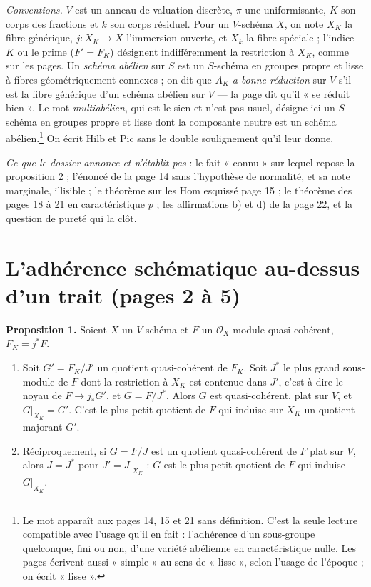 \documentclass[11pt,a4paper]{article}
\begin{document}
\emph{Conventions.} $V$ est un anneau de valuation discrète, $\pi$ une
uniformisante, $K$ son corps des fractions et $k$ son corps résiduel. Pour un
$V$-schéma $X$, on note $X_K$ la fibre générique, $j \colon X_K \to X$
l'immersion ouverte, et $X_k$ la fibre spéciale ; l'indice $K$ ou le prime
($F' = F_K$) désignent indifféremment la restriction à $X_K$, comme sur les
pages. Un \emph{schéma abélien} sur $S$ est un $S$-schéma en groupes propre et
lisse à fibres géométriquement connexes ; on dit que $A_K$ \emph{a bonne
réduction} sur $V$ s'il est la fibre générique d'un schéma abélien sur $V$ ---
la page dit qu'il « se réduit bien ». Le mot \emph{multiabélien}, qui est le
sien et n'est pas usuel, désigne ici un $S$-schéma en groupes propre et lisse
dont la composante neutre est un schéma abélien.\footnote{Le mot apparaît aux
pages 14, 15 et 21 sans définition. C'est la seule lecture compatible avec
l'usage qu'il en fait : l'adhérence d'un sous-groupe quelconque, fini ou non,
d'une variété abélienne en caractéristique nulle. Les pages écrivent aussi
« simple » au sens de « lisse », selon l'usage de l'époque ; on écrit
« lisse ».} On écrit $\mathrm{Hilb}$ et $\mathrm{Pic}$ sans le double
soulignement qu'il leur donne.

\emph{Ce que le dossier annonce et n'établit pas} : le fait « connu » sur
lequel repose la proposition 2 ; l'énoncé de la page 14 sans l'hypothèse de
normalité, et sa note marginale, illisible ; le théorème sur les
$\mathrm{Hom}$ esquissé page 15 ; le théorème des pages 18 à 21 en
caractéristique $p$ ; les affirmations b) et d) de la page 22, et la question
de pureté qui la clôt.

\section*{L'adhérence schématique au-dessus d'un trait (pages 2 à 5)}

\textbf{Proposition 1.} Soient $X$ un $V$-schéma et $F$ un $\mathcal{O}_X$-module
quasi-cohérent, $F_K = j^{*}F$.
\begin{enumerate}
\item[(i)] Soit $G' = F_K/J'$ un quotient quasi-cohérent de $F_K$. Soit $J^{*}$
le plus grand sous-module de $F$ dont la restriction à $X_K$ est contenue dans
$J'$, c'est-à-dire le noyau de $F \to j_{*}G'$, et $G = F/J^{*}$. Alors $G$ est
quasi-cohérent, plat sur $V$, et $G|_{X_K} = G'$. C'est le plus petit quotient
de $F$ qui induise sur $X_K$ un quotient majorant $G'$.
\item[(ii)] Réciproquement, si $G = F/J$ est un quotient quasi-cohérent de $F$
plat sur $V$, alors $J = J^{*}$ pour $J' = J|_{X_K}$ : $G$ est le plus petit
quotient de $F$ qui induise $G|_{X_K}$.
\end{enumerate}
\end{document}
